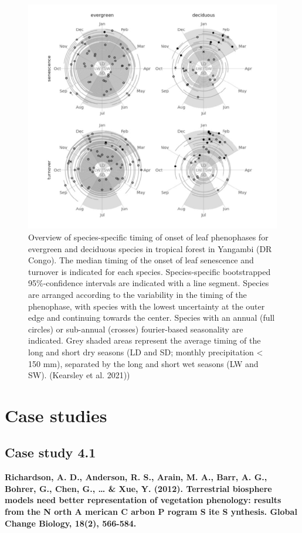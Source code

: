 \documentclass[12pt,oneside]{book}
\begin{document}
\begin{figure}

{\centering \includegraphics[width=0.8\linewidth]{figures/chap4/f410_kearsley} 

}

\caption{Overview of species-specific timing of onset of leaf phenophases for evergreen and deciduous species in tropical forest in Yangambi (DR Congo). The median timing of the onset of leaf senescence and turnover is indicated for each species. Species-specific bootstrapped 95\%-confidence intervals are indicated with a line segment. Species are arranged according to the variability in the timing of the phenophase, with species with the lowest uncertainty at the outer edge and continuing towards the center. Species with an annual (full circles) or sub-annual (crosses) fourier-based seasonality are indicated. Grey shaded areas represent the average timing of the long and short dry seasons (LD and SD; monthly precipitation < 150 mm), separated by the long and short wet seasons (LW and SW). (Kearsley et al. 2021))}\label{fig:f48}
\end{figure}

\section{Case studies}\label{case-studies-2}

\subsection{Case study 4.1}\label{case-study-4.1}

\textbf{Richardson, A. D., Anderson, R. S., Arain, M. A., Barr, A. G.,
Bohrer, G., Chen, G., \ldots{} \& Xue, Y. (2012). Terrestrial biosphere
models need better representation of vegetation phenology: results from
the N orth A merican C arbon P rogram S ite S ynthesis. Global Change
Biology, 18(2), 566-584.}
\end{document}
